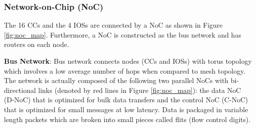 \documentclass[conference,compsoc]{IEEEtran}
\newcommand{\comment}[1]{}
\begin{document}


\vspace{-2mm}
\subsubsection{Network-on-Chip (NoC)}
\label{sec:noc}
The 16 CCs and the 4 IOSs are connected by a NoC as shown in Figure \ref{fig:noc_map}.
Furthermore, a NoC is constructed \comment{1-12} as the bus network and has routers on each node.

\textbf{Bus Network}:
Bus network connects nodes (CCs and IOSs) with torus topology \cite{dally2001route}
which \comment{1-13} involves a low average number of hops when compared to mesh topology.
The network is actually composed of the following two parallel NoCs with bi-directional links (denoted by red lines in Figure \ref{fig:noc_map}):
the data NoC (D-NoC) that is optimized for bulk data transfers and the control NoC (C-NoC) that is optimized for small messages at low latency.
Data is packaged in variable length packets which are broken into small pieces called flits (flow control digits).
\end{document}
